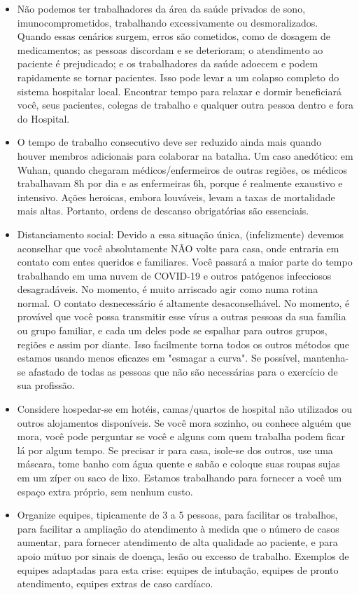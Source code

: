 \documentclass[onecolumn,journal]{IEEEtran}
\begin{document}
\begin{multicols}{2}
\begin{itemize}
    \item Não podemos ter trabalhadores da área da saúde privados de sono, imunocomprometidos, trabalhando excessivamente ou desmoralizados. Quando essas cenários surgem, erros são cometidos, como de dosagem de medicamentos; as pessoas discordam e se deterioram; o atendimento ao paciente é prejudicado; e os trabalhadores da saúde adoecem e podem rapidamente se tornar pacientes. Isso pode levar a um colapso completo do sistema hospitalar local. Encontrar tempo para relaxar e dormir beneficiará você, seus pacientes, colegas de trabalho e qualquer outra pessoa dentro e fora do Hospital.
    \item O tempo de trabalho consecutivo deve ser reduzido ainda mais quando houver membros adicionais para colaborar na batalha. Um caso anedótico: em Wuhan, quando chegaram médicos/enfermeiros de outras regiões, os médicos trabalhavam 8h por dia e as enfermeiras 6h, porque é realmente exaustivo e intensivo. Ações heroicas, embora louváveis, levam a taxas de mortalidade mais altas. Portanto, ordens de descanso obrigatórias são essenciais.
    \item Distanciamento social: Devido a essa situação única, (infelizmente) devemos aconselhar que você absolutamente NÃO volte para casa, onde entraria em contato com entes queridos e familiares. Você passará a maior parte do tempo trabalhando em uma nuvem de COVID-19 e outros patógenos infecciosos desagradáveis. No momento, é muito arriscado agir como numa rotina normal. O contato desnecessário é altamente desaconselhável. No momento, é provável que você possa transmitir esse vírus a outras pessoas da sua família ou grupo familiar, e cada um deles pode se espalhar para outros grupos, regiões e assim por diante. Isso facilmente torna todos os outros métodos que estamos usando menos eficazes em "esmagar a curva". Se possível, mantenha-se afastado de todas as pessoas que não são necessárias para o exercício de sua profissão.
    \item Considere hospedar-se em hotéis, camas/quartos de hospital não utilizados ou outros alojamentos disponíveis. Se você mora sozinho, ou conhece alguém que mora, você pode perguntar se você e alguns com quem trabalha podem ficar lá por algum tempo. Se precisar ir para casa, isole-se dos outros, use uma máscara, tome banho com água quente e sabão e coloque suas roupas sujas em um zíper ou saco de lixo. Estamos trabalhando para fornecer a você um espaço extra próprio, sem nenhum custo.
    \item Organize equipes, tipicamente de 3 a 5 pessoas, para facilitar os trabalhos, para facilitar a ampliação do atendimento à medida que o número de casos aumentar, para fornecer atendimento de alta qualidade ao paciente, e para apoio mútuo por sinais de doença, lesão ou excesso de trabalho. Exemplos de equipes adaptadas para esta crise: equipes de intubação, equipes de pronto atendimento, equipes extras de caso cardíaco.

\end{itemize}
\end{multicols}
\end{document}
